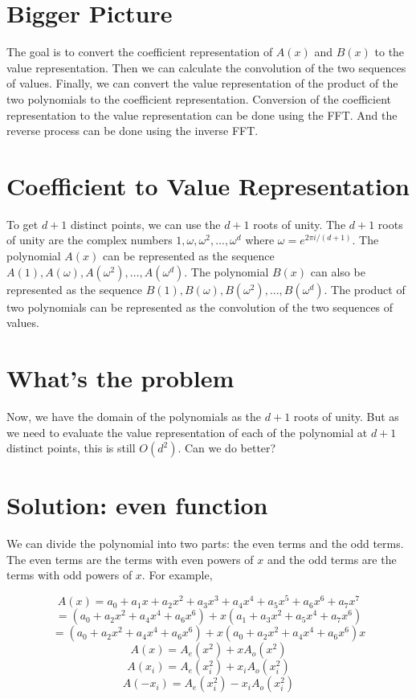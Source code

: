 \documentclass{report}
\begin{document}
\section{Bigger Picture} 

The goal is to convert the coefficient representation of $A(x) $ and $B(x)$ to the value representation. Then we can calculate the convolution of the two sequences of values. Finally, we can convert the value representation of the product of the two polynomials to the coefficient representation. \newline
Conversion of the coefficient representation to the value representation can be done using the FFT. And the reverse process can be done using the inverse FFT. \newline

\section{Coefficient to Value Representation}
To get \(d+1\) distinct points, we can use the \(d+1\) roots of unity. The \(d+1\) roots of unity are the complex numbers \(1, \omega, \omega^2, \ldots, \omega^d\) where \(\omega = e^{2\pi i/(d+1)}\). The polynomial \(A(x)\) can be represented as the sequence \(A(1), A(\omega), A(\omega^2), \ldots, A(\omega^d)\). The polynomial \(B(x)\) can also be represented as the sequence \(B(1), B(\omega), B(\omega^2), \ldots, B(\omega^d)\). The product of two polynomials can be represented as the convolution of the two sequences of values.


\section{What's the problem}
Now, we have the domain of the polynomials as the \(d+1\) roots of unity. But as we need to evaluate the value representation of each of the polynomial at \(d+1\) distinct points, this is still \(O(d^2)\). Can we do better? 

\section{Solution: even function}
We can divide the polynomial into two parts: the even terms and the odd terms. The even terms are the terms with even powers of \(x\) and the odd terms are the terms with odd powers of \(x\). For example, 



    
	$$A(x) = a_0 + a_1x + a_2x^2 + a_3x^3 + a_4x^4 + a_5x^5 + a_6x^6 + a_7x^7$$
	$$ = (a_0 + a_2x^2 + a_4x^4 + a_6x^6) + x(a_1 + a_3x^2 + a_5x^4 + a_7x^6)$$
	$$ =  (a_0 + a_2x^2 + a_4x^4 + a_6x^6) + x(a_0 + a_2x^2 + a_4x^4 + a_6x^6)x $$
	$$A(x)= A_e(x^2) + xA_o(x^2)$$
	$$A(x_i) = A_e(x_i^2) + x_iA_o(x_i^2)$$
	$$A(-x_i) = A_e(x_i^2) - x_iA_o(x_i^2)$$
\end{document}
